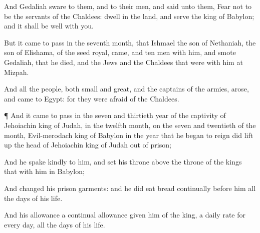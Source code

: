 {And
Gedaliah
sware to them, and to their
men, and
said unto them,
Fear not to be the
servants of the
Chaldees:
dwell in the
land, and
serve the
king of
Babylon; and it shall be
well with you.

But it came to pass in the
seventh
month, that
Ishmael the
son of
Nethaniah, the
son of
Elishama, of the
seed
royal,
came, and
ten
men with him, and
smote
Gedaliah, that he
died, and the
Jews and the
Chaldees that were with him at
Mizpah.

And all the
people, both
small and
great, and the
captains of the
armies,
arose, and
came to
Egypt: for they were
afraid
of the
Chaldees.


\par }{\PP {}¶ And it came to pass in the
seven and
thirtieth
year of the
captivity of
Jehoiachin
king of
Judah, in the
twelfth
month, on the
seven and
twentieth
{} of the
month,
{}
Evil-merodach
king of
Babylon in the
year that he began to
reign did lift
up the
head of
Jehoiachin
king of
Judah out of
prison;

And he
spake
kindly to him, and
set his
throne above the
throne of the
kings that
{} with him in
Babylon;

And
changed his
prison
garments: and he did
eat
bread
continually
before him all the
days of his
life.

And his
allowance
{} a
continual
allowance
given him of the
king, a
daily
rate for every
day, all the
days of his
life.


\par }